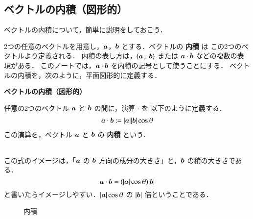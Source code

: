 ﻿%
            \subsection{ベクトルの内積（図形的）}\label{subsec:VecNaisekiFig}
                ベクトルの内積について，簡単に説明をしておこう．

                2つの任意のベクトルを用意し，$\boldsymbol{a}$，$\boldsymbol{b}$ とする．ベクトルの \textbf{内積} は
                この2つのベクトルより定義される．
                内積の表し方は，$(\boldsymbol{a}\,,\;\boldsymbol{b})$ または $\boldsymbol{a}\cdot\boldsymbol{b}$ などの複数の表現がある．
                このノートでは，$\boldsymbol{a}\cdot\boldsymbol{b}$ を内積の記号として使うことにする．
                ベクトルの内積を，次のように，平面図形的に定義する．
                    \\
                    \begin{itembox}[l]{\textbf{ベクトルの内積（図形的）}}
                        \begin{dfn}
                            任意の2つのベクトル $\boldsymbol{a}$ と $\boldsymbol{b}$ の間に，演算 $\cdot$ を
                            以下のように定義する．
                            \begin{align}
                                 \boldsymbol{a}\cdot\boldsymbol{b} := | \boldsymbol{a} |  | \boldsymbol{b} | \cos\theta
                            \end{align}
                            この演算を，ベクトル $\boldsymbol{a}$ と $\boldsymbol{b}$ の \textbf{内積} という．
                        \end{dfn}
                    \end{itembox}
                    \\

                この式のイメージは，「$\boldsymbol{a}$ の $\boldsymbol{b}$ 方向の成分の大きさ」と，$\boldsymbol{b}$ の積の大きさである．
                    \begin{equation*}
                        \boldsymbol{a}\cdot\boldsymbol{b} = ( | \boldsymbol{a} | \cos\theta ) | \boldsymbol{b} |
                    \end{equation*}
                と書いたらイメージしやすい．$| \boldsymbol{a} | \cos\theta$ の $|\boldsymbol{b}|$ 倍ということである．

                    \begin{figure}[hbt]
                        \begin{center}
                            \caption{内積}
                            \label{fig:bekutoru_no_naiseki}
                        \end{center}
                    \end{figure}

